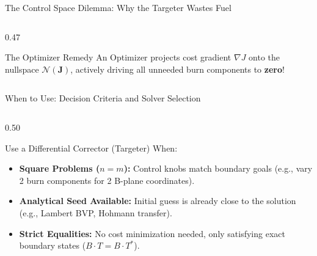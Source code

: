 \documentclass[aspectratio=169, 10pt]{beamer}
\begin{document}
\begin{frame}{The Control Space Dilemma: Why the Targeter Wastes Fuel}
\begin{columns}[t]
\begin{column}{0.47\textwidth}
            \vspace{-0.08cm}

            \begin{exampleblock}{The Optimizer Remedy}
                \scriptsize
                An Optimizer projects cost gradient $\nabla J$ onto the nullspace $\mathcal{N}(\mathbf{J})$, actively driving all unneeded burn components to \textbf{zero}!
            \end{exampleblock}
        \end{column}
    \end{columns}
\end{frame}

\begin{frame}{When to Use: Decision Criteria and Solver Selection}
    \begin{columns}[t]
        \begin{column}{0.50\textwidth}
            \begin{block}{Use a Differential Corrector (Targeter) When:}
                \scriptsize
                \begin{itemize}\setlength{\itemsep}{1.2pt}
                    \item \textbf{Square Problems ($n = m$):} Control knobs match boundary goals (e.g., vary 2 burn components for 2 B-plane coordinates).
                    \item \textbf{Analytical Seed Available:} Initial guess is already close to the solution (e.g., Lambert BVP, Hohmann transfer).
                    \item \textbf{Strict Equalities:} No cost minimization needed, only satisfying exact boundary states ($B\cdot T = B\cdot T^*$).
                \end{itemize}
            \end{block}

            \vspace{-0.08cm}


\end{column}
\end{columns}
\end{frame}
\end{document}
